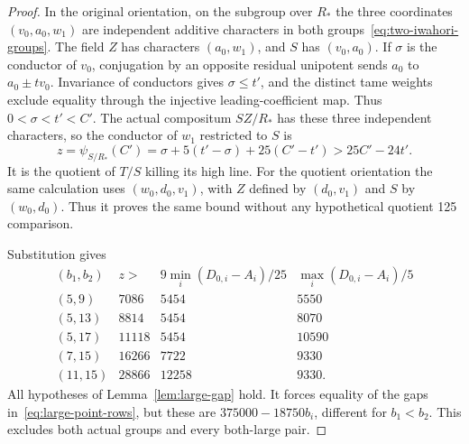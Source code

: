 \begin{proof}
In the original orientation, on the subgroup over $R_*$ the three coordinates $(v_0,a_0,w_1)$ are independent additive characters in both groups~\eqref{eq:two-iwahori-groups}. The field $Z$ has characters $(a_0,w_1)$, and $S$ has $(v_0,a_0)$. If $\sigma$ is the conductor of $v_0$, conjugation by an opposite residual unipotent sends $a_0$ to $a_0\pm t v_0$. Invariance of conductors gives $\sigma\le t'$, and the distinct tame weights exclude equality through the injective leading-coefficient map. Thus $0<\sigma<t'<C'$. The actual compositum $SZ/R_*$ has these three independent characters, so the conductor of $w_1$ restricted to $S$ is
\[
 z=\psi_{S/R_*}(C')
   =\sigma+5(t'-\sigma)+25(C'-t')>25C'-24t'.
\]
It is the quotient of $T/S$ killing its high line. For the quotient orientation the same calculation uses $(w_0,d_0,v_1)$, with $Z$ defined by $(d_0,v_1)$ and $S$ by $(w_0,d_0)$. Thus it proves the same bound without any hypothetical quotient 125 comparison.

Substitution gives
\[
\begin{array}{c|r|r|r}
 (b_1,b_2)&z>&9\min_i(D_{0,i}-A_i)/25&\max_i(D_{0,i}-A_i)/5\\\hline
 (5,9)&7086&5454&5550\\
 (5,13)&8814&5454&8070\\
 (5,17)&11118&5454&10590\\
 (7,15)&16266&7722&9330\\
 (11,15)&28866&12258&9330.
\end{array}
\]
All hypotheses of Lemma~\ref{lem:large-gap} hold. It forces equality of the gaps in~\eqref{eq:large-point-rows}, but these are $375000-18750b_i$, different for $b_1<b_2$. This excludes both actual groups and every both-large pair.
\end{proof}

